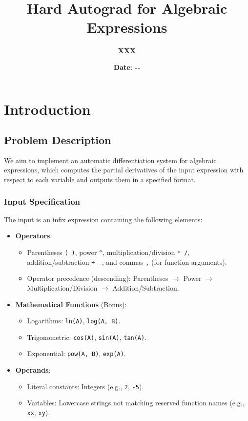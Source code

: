 \documentclass{report}
\title{\Huge\textbf{Hard Autograd for Algebraic Expressions}}
\author{\LARGE\textbf{XXX}}
\date{\LARGE\textbf{Date: \the\year-\the\month-\the\day}}
\begin{document}
\maketitle


\chapter{Introduction}
\section*{Problem Description}
We aim to implement an automatic differentiation system for algebraic expressions, which computes the partial derivatives of the input expression with respect to each variable and outputs them in a specified format.

\subsection*{Input Specification}
The input is an infix expression containing the following elements:
\begin{itemize}
    \item \textbf{Operators}: 
    \begin{itemize}
        \item Parentheses \texttt{( )}, power \texttt{\^}, multiplication/division \texttt{* /}, addition/subtraction \texttt{+ -}, and commas \texttt{,} (for function arguments).
        \item Operator precedence (descending): Parentheses $\rightarrow$ Power $\rightarrow$ Multiplication/Division $\rightarrow$ Addition/Subtraction.
    \end{itemize}
    \item \textbf{Mathematical Functions} (Bonus):
    \begin{itemize}
        \item Logarithms: \texttt{ln(A)}, \texttt{log(A, B)}.
        \item Trigonometric: \texttt{cos(A)}, \texttt{sin(A)}, \texttt{tan(A)}.
        \item Exponential: \texttt{pow(A, B)}, \texttt{exp(A)}.
    \end{itemize}
    \item \textbf{Operands}:
    \begin{itemize}
        \item Literal constants: Integers (e.g., \texttt{2}, \texttt{-5}).
        \item Variables: Lowercase strings not matching reserved function names (e.g., \texttt{xx}, \texttt{xy}).
    \end{itemize}
\end{itemize}
\end{document}
